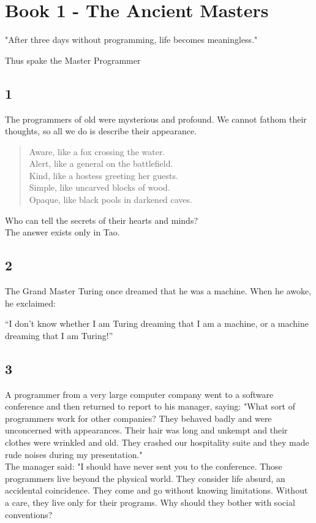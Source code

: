 \documentclass[14pt, letterpaper]{book}
\begin{document}
\chapter*{Book 1 - The Ancient Masters}
\epigraph{"After three days without programming, life becomes meaningless."}{Thus spake the Master Programmer}

\section*{1}
The programmers of old were mysterious and profound. We cannot fathom their thoughts, so all we do is describe their appearance.\\

\begin{verse}
Aware, like a fox crossing the water. \\
Alert, like a general on the battlefield. \\
Kind, like a hostess greeting her guests. \\
Simple, like uncarved blocks of wood. \\
Opaque, like black pools in darkened caves. \\
\end{verse}

Who can tell the secrets of their hearts and minds? \\
The answer exists only in Tao.

\section*{2}
The Grand Master Turing once dreamed that he was a machine. When he awoke, he exclaimed:

``I don't know whether I am Turing dreaming that I am a machine, or a machine dreaming that I am Turing!''

\section*{3}
A programmer from a very large computer company went to a software conference and then returned to report to his manager, saying: "What sort of programmers work for other companies? They behaved badly and were unconcerned with appearances. Their hair was long and unkempt and their clothes were wrinkled and old. They crashed our hospitality suite and they made rude noises during my presentation."\\

The manager said: "I should have never sent you to the conference. Those programmers live beyond the physical world. They consider life absurd, an accidental coincidence. They come and go without knowing limitations. Without a care, they live only for their programs. Why should they bother with social conventions?\\
\end{document}
